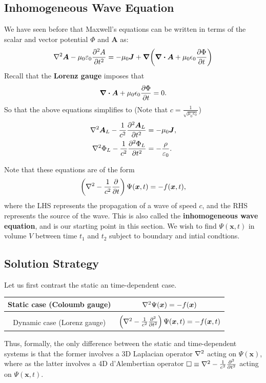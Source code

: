 \documentclass[12pt,english]{article}
\renewcommand{\vec}[1]{\boldsymbol{#1}}
\begin{document}
\subsection{Inhomogeneous Wave Equation}
We have seen before that Maxwell's equations can be written in terms of the scalar and vector potential $\Phi$ and $\vec{A}$ as:
\begin{equation*}
    \laplacian \vec{A} - \mu_0\varepsilon_0 \pdv[2]{A}{t} = -\mu_0 \vec{J} + \grad(\div \vec{A} + \mu_0\epsilon_0 \pdv{\Phi}{t})
\end{equation*}
Recall that the \textbf{Lorenz gauge} imposes that
\begin{equation*}
    \div \vec{A} + \mu_0\epsilon_0 \pdv{\Phi}{t} = 0.
\end{equation*}
So that the above equations simplifies to (Note that $c = \frac{1}{\sqrt{\mu_0\varepsilon_0}}$)
\begin{subequations}
    \begin{align}
        \laplacian \vec{A}_L - \frac{1}{c^2}\pdv[2]{\vec{A}_L}{t} & = -\mu_0\vec{J}               , \\
        \laplacian \Phi_L -\frac{1}{c^2}\pdv[2]{\Phi_L}{t}        & = -\frac{\rho}{\varepsilon_0}.
    \end{align}
\end{subequations}

Note that these equations are of the form
\begin{equation}
    \left(\laplacian - \frac{1}{c^2} \pdv{t}\right)\Psi(\vec{x},t) = -f(\vec{x},t), \label{eqn:inhoWaveEqn}
\end{equation}
where the LHS represents the propagation of a wave of speed $c$, and the RHS represents the source of the wave. This is also called the \textbf{inhomogeneous wave equation}, and is our starting point in this section. We wish to find $\Psi(\vec{x},t)$ in volume $V$ between time $t_1$ and $t_2$ subject to boundary and intial condtions.


\subsection{Solution Strategy}
Let us first contrast the static an time-dependent case.

\begin{center}
    \begin{tabular}{c | c}
        Static case (Coloumb gauge) & $\laplacian \Psi(\vec{x}) = -f(\vec{x})$                                            \\[2ex]
        \hline                                                                                                            \\
        Dynamic case (Lorenz gauge) & $\left(\laplacian - \frac{1}{c^2}\pdv[2]{t} \right)\Psi(\vec{x},t) = -f(\vec{x},t)$
    \end{tabular}
\end{center}
Thus, formally, the only difference between the static and time-dependent systems is that the former involves a 3D Laplacian operator $\laplacian$ acting on $\Psi(\vec{x})$, where as the latter involves a 4D d'Alembertian operator $\square \equiv \laplacian - \frac{1}{c^2}\pdv[2]{t}$ acting on $\Psi(\vec{x}, t)$.
\end{document}
